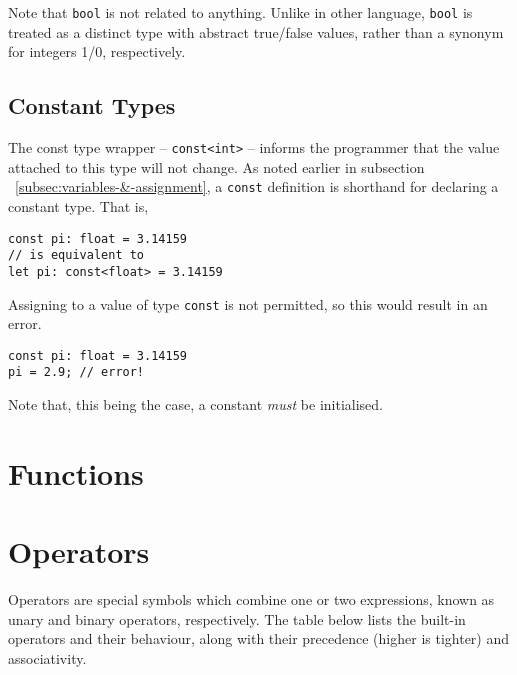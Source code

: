 \documentclass{article}
\begin{document}
    Note that \texttt{bool} is not related to anything.
    Unlike in other language, \texttt{bool} is treated as a distinct type with abstract true/false values, rather than a synonym for integers 1/0, respectively.

    \subsection{Constant Types}\label{subsec:constant-types}

    The const type wrapper -- \texttt{const<int>} -- informs the programmer that the value attached to this type will not change.
    As noted earlier in subsection ~\ref{subsec:variables-&-assignment}, a \texttt{const} definition is shorthand for declaring a constant type.
    That is,

    \begin{lstlisting}[language=CustomLang]
const pi: float = 3.14159
// is equivalent to
let pi: const<float> = 3.14159
    \end{lstlisting}

    Assigning to a value of type \texttt{const} is not permitted, so this would result in an error.

    \begin{lstlisting}[language=CustomLang]
const pi: float = 3.14159
pi = 2.9; // error!
    \end{lstlisting}

    Note that, this being the case, a constant \textit{must} be initialised.

    \section{Functions}

    \section{Operators}

    Operators are special symbols which combine one or two expressions, known as unary and binary operators, respectively.
    The table below lists the built-in operators and their behaviour, along with their precedence (higher is tighter) and associativity.
\end{document}
